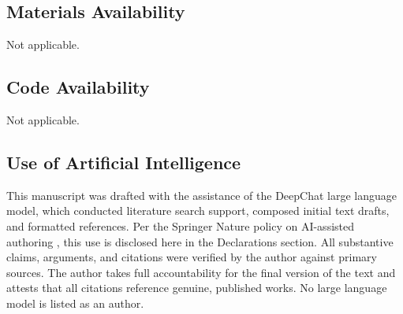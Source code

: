 \documentclass[pdflatex,sn-mathphys-num]{sn-jnl}%
\begin{document}
\subsection*{Materials Availability}
Not applicable.

\subsection*{Code Availability}
Not applicable.

\subsection*{Use of Artificial Intelligence}
This manuscript was drafted with the assistance of the DeepChat large language model, which conducted literature search support, composed initial text drafts, and formatted references. Per the Springer Nature policy on AI-assisted authoring \cite{SpringerAI2024}, this use is disclosed here in the Declarations section. All substantive claims, arguments, and citations were verified by the author against primary sources. The author takes full accountability for the final version of the text and attests that all citations reference genuine, published works. No large language model is listed as an author.


\end{document}
